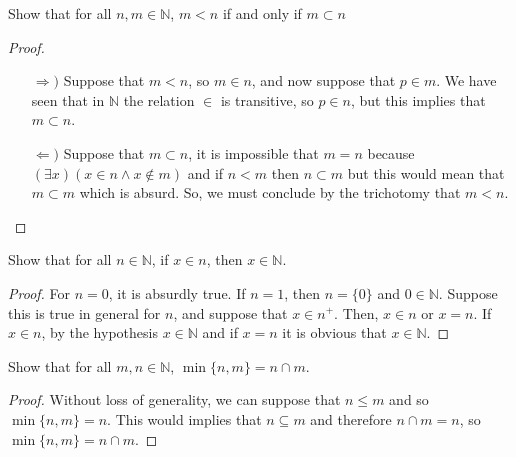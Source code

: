 \documentclass{tufte-handout}
\begin{document}
\begin{problem}
Show that for all $n, m \in \mathbb{N}$, $m < n$ if and only if $m \subset n$
\end{problem}
\begin{proof}
	\begin{itemize}
		\item[$\Rightarrow)$] Suppose that $m < n$, so $m \in n$, and now suppose that $p \in m$. We have seen that in $\mathbb{N}$ the relation $\in$ is transitive, so $p \in n$, but this implies that $m \subset n$.
		\item[$\Leftarrow)$] Suppose that $m \subset n$, it is impossible that $m = n$ because $(\exists x)(x \in n \wedge x \not \in m)$ and if $n < m$ then $n \subset m$ but this would mean that $m \subset m$ which is absurd. So, we must conclude by the trichotomy that $m < n$.  
	\end{itemize}
\end{proof}

\begin{problem}
	Show that for all $n \in \mathbb{N}$, if $x \in n$, then $x \in \mathbb{N}$.
\end{problem}
\begin{proof}
	For $n = 0$, it is absurdly true. If $n = 1$, then $n = \{0\}$ and $0 \in \mathbb{N}$. Suppose this is true in general for $n$, and suppose that $x \in n^+$. Then, $x \in n$ or $x = n$. If $x \in n$, by the hypothesis $x \in \mathbb{N}$ and if $x = n$ it is obvious that $x \in \mathbb{N}$.
\end{proof}

\begin{problem}
	Show that for all $m, n \in \mathbb{N}$, $\min\{n, m\}= n \cap m$.
\end{problem}
\begin{proof}
	Without loss of generality, we can suppose that $n \le m$ and so $\min\{n, m\} = n$. This would implies that $n \subseteq m$ and therefore $n \cap m = n$, so $\min\{n, m\} = n \cap m$.
\end{proof}
\end{document}
